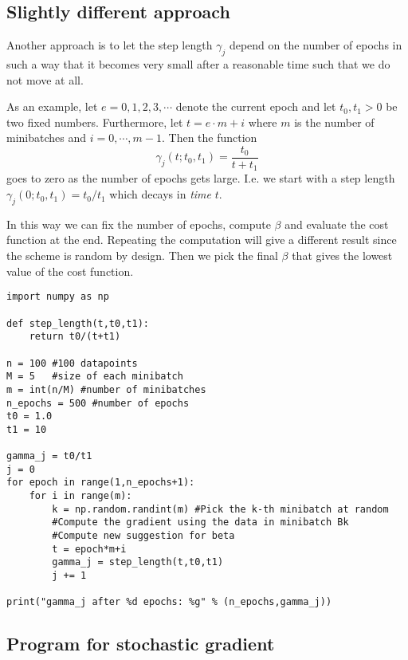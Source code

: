 \documentclass[%
oneside,                 %
final,                   %
10pt]{article}
\begin{document}
\subsection*{Slightly different approach}

Another approach is to let the step length $\gamma_j$ depend on the
number of epochs in such a way that it becomes very small after a
reasonable time such that we do not move at all.

As an example, let $e = 0,1,2,3,\cdots$ denote the current epoch and let $t_0, t_1 > 0$ be two fixed numbers. Furthermore, let $t = e \cdot m + i$ where $m$ is the number of minibatches and $i=0,\cdots,m-1$. Then the function $$\gamma_j(t; t_0, t_1) = \frac{t_0}{t+t_1} $$ goes to zero as the number of epochs gets large. I.e. we start with a step length $\gamma_j (0; t_0, t_1) = t_0/t_1$ which decays in \emph{time} $t$.

In this way we can fix the number of epochs, compute $\beta$ and
evaluate the cost function at the end. Repeating the computation will
give a different result since the scheme is random by design. Then we
pick the final $\beta$ that gives the lowest value of the cost
function.

\begin{verbatim}
import numpy as np 

def step_length(t,t0,t1):
    return t0/(t+t1)

n = 100 #100 datapoints 
M = 5   #size of each minibatch
m = int(n/M) #number of minibatches
n_epochs = 500 #number of epochs
t0 = 1.0
t1 = 10

gamma_j = t0/t1
j = 0
for epoch in range(1,n_epochs+1):
    for i in range(m):
        k = np.random.randint(m) #Pick the k-th minibatch at random
        #Compute the gradient using the data in minibatch Bk
        #Compute new suggestion for beta
        t = epoch*m+i
        gamma_j = step_length(t,t0,t1)
        j += 1

print("gamma_j after %d epochs: %g" % (n_epochs,gamma_j))
\end{verbatim}





\subsection*{Program for stochastic gradient}
\end{document}
